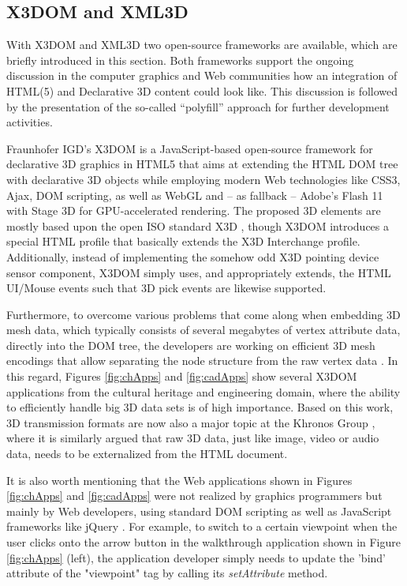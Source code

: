 \documentclass{acmsiggraph}
\begin{document}
\subsection{X3DOM and XML3D}

With X3DOM \cite{Behr2009} and XML3D \cite{Sons2010} two open-source frameworks are available, which are briefly introduced in this section. Both frameworks support the ongoing discussion in the computer graphics and Web communities how an integration of HTML(5) and Declarative 3D content could look like. This discussion is followed by the presentation of the so-called ``polyfill'' approach for further development activities.

Fraunhofer IGD's X3DOM \cite{Behr2009,Behr12} is a JavaScript-based open-source framework for declarative 3D graphics in HTML5 that aims at extending the HTML DOM tree with declarative 3D objects while employing modern Web technologies like CSS3, Ajax, DOM scripting, as well as WebGL and -- as fallback -- Adobe's Flash 11 with Stage 3D \cite{flash} for GPU-accelerated rendering. The proposed 3D elements are mostly based upon the open ISO standard X3D \cite{Web3D-X3D}, though X3DOM introduces a special HTML profile that basically extends the X3D Interchange profile. Additionally, instead of implementing the somehow odd X3D pointing device sensor component, X3DOM simply uses, and appropriately extends, the HTML UI/Mouse events such that 3D pick events are likewise supported.

Furthermore, to overcome various problems that come along when embedding 3D mesh data, which typically consists of several megabytes of vertex attribute data, directly into the DOM tree, the developers are working on efficient 3D mesh encodings that allow separating the node structure from the raw vertex data \cite{Behr12}. In this regard, Figures \ref{fig:chApps} and \ref{fig:cadApps} show several X3DOM applications from the cultural heritage and engineering domain, where the ability to efficiently handle big 3D data sets is of high importance.
Based on this work, 3D transmission formats are now also a major topic at the Khronos Group \cite{Trevett12}, where it is similarly argued that raw 3D data, just like image, video or audio data, needs to be externalized from the HTML document.

It is also worth mentioning that the Web applications shown in Figures \ref{fig:chApps} and \ref{fig:cadApps} were not realized by graphics programmers but mainly by Web developers, using standard DOM scripting as well as JavaScript frameworks like jQuery \cite{jquery}. For example, to switch to a certain viewpoint when the user clicks onto the arrow button in the walkthrough application shown in Figure \ref{fig:chApps} (left), the application developer simply needs to update the 'bind' attribute of the "viewpoint" tag by calling its \emph{setAttribute} method.
\end{document}
